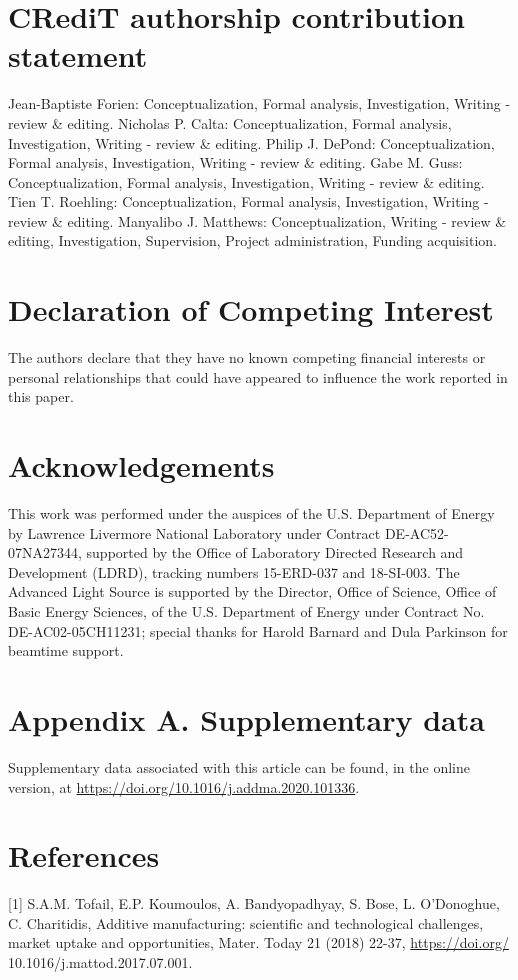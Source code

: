 \documentclass[10pt]{article}
\begin{document}
\section*{CRediT authorship contribution statement}
Jean-Baptiste Forien: Conceptualization, Formal analysis, Investigation, Writing - review \& editing. Nicholas P. Calta: Conceptualization, Formal analysis, Investigation, Writing - review \& editing. Philip J. DePond: Conceptualization, Formal analysis, Investigation, Writing - review \& editing. Gabe M. Guss: Conceptualization, Formal analysis, Investigation, Writing - review \& editing. Tien T. Roehling: Conceptualization, Formal analysis, Investigation, Writing - review \& editing. Manyalibo J. Matthews: Conceptualization, Writing - review \& editing, Investigation, Supervision, Project administration, Funding acquisition.

\section*{Declaration of Competing Interest}
The authors declare that they have no known competing financial interests or personal relationships that could have appeared to influence the work reported in this paper.

\section*{Acknowledgements}
This work was performed under the auspices of the U.S. Department of Energy by Lawrence Livermore National Laboratory under Contract DE-AC52-07NA27344, supported by the Office of Laboratory Directed Research and Development (LDRD), tracking numbers 15-ERD-037 and 18-SI-003. The Advanced Light Source is supported by the Director, Office of Science, Office of Basic Energy Sciences, of the U.S. Department of Energy under Contract No. DE-AC02-05CH11231; special thanks for Harold Barnard and Dula Parkinson for beamtime support.

\section*{Appendix A. Supplementary data}
Supplementary data associated with this article can be found, in the online version, at \href{https://doi.org/10.1016/j.addma.2020.101336}{https://doi.org/10.1016/j.addma.2020.101336}.

\section*{References}
[1] S.A.M. Tofail, E.P. Koumoulos, A. Bandyopadhyay, S. Bose, L. O'Donoghue, C. Charitidis, Additive manufacturing: scientific and technological challenges, market uptake and opportunities, Mater. Today 21 (2018) 22-37, \href{https://doi.org/}{https://doi.org/} 10.1016/j.mattod.2017.07.001.
\end{document}
